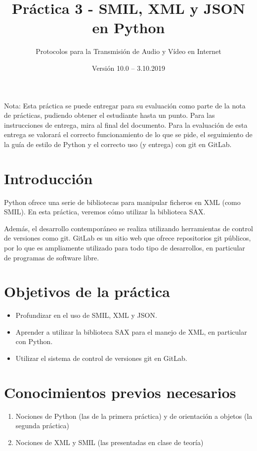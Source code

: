 \documentclass[11pt,a4paper]{article}
\begin{document}
\title{Práctica 3 - SMIL, XML y JSON en Python}
\author{Protocolos para la Transmisión de Audio y Vídeo en Internet}
\date{Versión 10.0 – 3.10.2019}


\maketitle


Nota: Esta práctica se puede entregar para su evaluación como parte de la nota de prácticas, pudiendo obtener el estudiante hasta un punto. Para las instrucciones de entrega, mira al final del documento. Para la evaluación de esta entrega se valorará el correcto funcionamiento de lo que se pide, el seguimiento de la guía de estilo de Python y el correcto uso (y entrega) con git en GitLab.

\section{Introducción}

Python ofrece una serie de bibliotecas para manipular ficheros en XML (como SMIL). En esta práctica, veremos cómo utilizar la biblioteca SAX.

Además, el desarrollo contemporáneo se realiza utilizando herramientas de control de versiones como git. GitLab es un sitio web que ofrece repositorios git públicos, por lo que es ampliamente utilizado para todo tipo de desarrollos, en particular de programas de software libre.

\section{Objetivos de la práctica}

\begin{itemize}
  \item Profundizar en el uso de SMIL, XML y JSON.
  \item Aprender a utilizar la biblioteca SAX para el manejo de XML, en particular con Python.
  \item Utilizar el sistema de control de versiones git en GitLab.
\end{itemize}

\section{Conocimientos previos necesarios}

\begin{enumerate}
  \item Nociones de Python (las de la primera práctica) y de orientación a objetos (la segunda práctica)
  \item Nociones de XML y SMIL (las presentadas en clase de teoría)
\end{enumerate}
\end{document}
